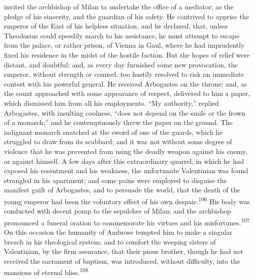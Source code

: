 invited the archbishop of Milan to undertake the office of a
mediator; as the pledge of his sincerity, and the guardian of his
safety. He contrived to apprise the emperor of the East of his
helpless situation, and he declared, that, unless Theodosius
could speedily march to his assistance, he must attempt to escape
from the palace, or rather prison, of Vienna in Gaul, where he
had imprudently fixed his residence in the midst of the hostile
faction. But the hopes of relief were distant, and doubtful: and,
as every day furnished some new provocation, the emperor, without
strength or counsel, too hastily resolved to risk an immediate
contest with his powerful general. He received Arbogastes on the
throne; and, as the count approached with some appearance of
respect, delivered to him a paper, which dismissed him from all
his employments. “My authority,” replied Arbogastes, with
insulting coolness, “does not depend on the smile or the frown of
a monarch;” and he contemptuously threw the paper on the ground.
The indignant monarch snatched at the sword of one of the guards,
which he struggled to draw from its scabbard; and it was not
without some degree of violence that he was prevented from using
the deadly weapon against his enemy, or against himself. A few
days after this extraordinary quarrel, in which he had exposed
his resentment and his weakness, the unfortunate Valentinian was
found strangled in his apartment; and some pains were employed to
disguise the manifest guilt of Arbogastes, and to persuade the
world, that the death of the young emperor had been the voluntary
effect of his own despair.\textsuperscript{106} His body was conducted with decent
pomp to the sepulchre of Milan; and the archbishop pronounced a
funeral oration to commemorate his virtues and his misfortunes.\textsuperscript{107}
On this occasion the humanity of Ambrose tempted him to make
a singular breach in his theological system; and to comfort the
weeping sisters of Valentinian, by the firm assurance, that their
pious brother, though he had not received the sacrament of
baptism, was introduced, without difficulty, into the mansions of
eternal bliss.\textsuperscript{108}



